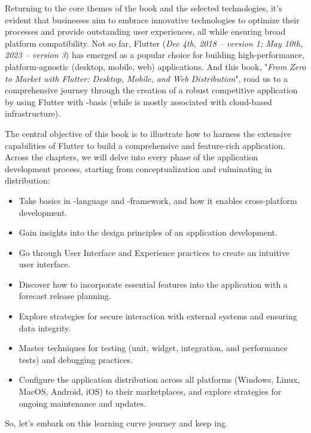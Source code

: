 Returning to the core themes of the book and the selected technologies, it's evident that businesses aim to embrace 
innovative technologies to optimize their processes and provide outstanding user experiences, all while ensuring 
broad platform compatibility. Not so far, Flutter (\emph{Dec 4th, 2018 -- version 1; May 10th, 2023 -- version 3}) 
has emerged as a popular choice for building high-performance, platform-agnostic (desktop, mobile, web) applications. 
And this book, "\emph{From Zero to Market with Flutter: Desktop, Mobile, and Web Distribution}", road us to a 
comprehensive journey through the creation of a robust competitive application by using Flutter with 
-basis (while  is mostly associated with cloud-based infrastructure).

The central objective of this book is to illustrate how to harness the extensive capabilities of Flutter to build a 
comprehensive and feature-rich application. Across the chapters, we will delve into every phase of the application 
development process, starting from conceptualization and culminating in distribution:

\begin{itemize}
\setlength{\itemsep}{3pt}
\setlength{\parskip}{0pt}
\setlength{\parsep}{0pt}
  \item Take basics in -language and -framework, and how it enables cross-platform development.

  \item Gain insights into the design principles of an application development. 
  
  \item Go through User Interface and Experience practices to create an intuitive user interface.

  \item Discover how to incorporate essential features into the application with a forecast release planning.

  \item Explore strategies for secure interaction with external systems and ensuring data integrity.

  \item Master techniques for testing (unit, widget, integration, and performance tests) and debugging practices. 

  \item Configure the application distribution across all platforms (Windows, Linux, MacOS, Android, iOS) to their 
  marketplaces, and explore strategies for ongoing maintenance and updates.
\end{itemize}

\noindent So, let's embark on this learning curve journey and keep ing.